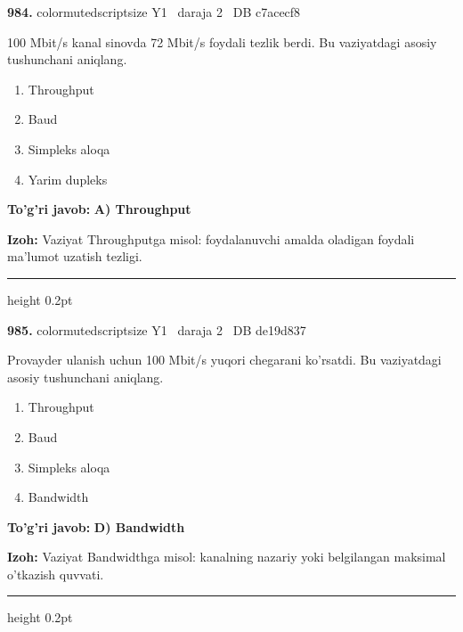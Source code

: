 \documentclass[10pt,a4paper,oneside]{article}
\begin{document}
\noindent\textbf{\color{ink}984.}  {color{muted}scriptsize Y1 \textbullet\ daraja 2 \textbullet\ DB c7acecf8}
\par
100 Mbit/s kanal sinovda 72 Mbit/s foydali tezlik berdi. Bu vaziyatdagi asosiy tushunchani aniqlang.
\begin{enumerate}[label=\Alph*),leftmargin=9mm]
\item Throughput
\item Baud
\item Simpleks aloqa
\item Yarim dupleks
\end{enumerate}
\begin{tcolorbox}[enhanced,breakable,colback=teal!4,colframe=teal!50!black,boxrule=0.5pt,arc=1.1mm,left=3mm,right=3mm,top=1.7mm,bottom=1.7mm,before skip=2mm,after skip=2mm]
\textbf{\color{teal}To'g'ri javob:} \textbf{A) Throughput}
\par\smallskip
\textbf{Izoh:} Vaziyat Throughputga misol: foydalanuvchi amalda oladigan foydali ma'lumot uzatish tezligi.
\end{tcolorbox}
\vspace{2mm}\hrule height 0.2pt \vspace{3mm}

\noindent\textbf{\color{ink}985.}  {color{muted}scriptsize Y1 \textbullet\ daraja 2 \textbullet\ DB de19d837}
\par
Provayder ulanish uchun 100 Mbit/s yuqori chegarani ko'rsatdi. Bu vaziyatdagi asosiy tushunchani aniqlang.
\begin{enumerate}[label=\Alph*),leftmargin=9mm]
\item Throughput
\item Baud
\item Simpleks aloqa
\item Bandwidth
\end{enumerate}
\begin{tcolorbox}[enhanced,breakable,colback=teal!4,colframe=teal!50!black,boxrule=0.5pt,arc=1.1mm,left=3mm,right=3mm,top=1.7mm,bottom=1.7mm,before skip=2mm,after skip=2mm]
\textbf{\color{teal}To'g'ri javob:} \textbf{D) Bandwidth}
\par\smallskip
\textbf{Izoh:} Vaziyat Bandwidthga misol: kanalning nazariy yoki belgilangan maksimal o'tkazish quvvati.
\end{tcolorbox}
\vspace{2mm}\hrule height 0.2pt \vspace{3mm}
\end{document}
